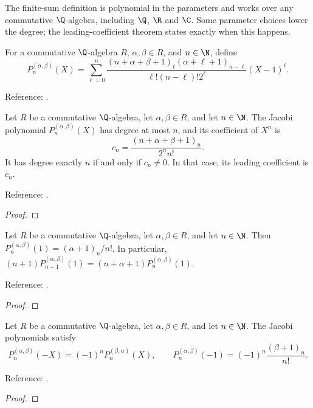 The finite-sum definition is polynomial in the parameters and works over any commutative $\Q$-algebra, including $\Q$, $\R$ and $\C$. Some parameter choices lower the degree; the leading-coefficient theorem states exactly when this happens.

\begin{definition}
\label{def:jacobi}
\leanok
For a commutative $\Q$-algebra $R$, $\alpha,\beta\in R$, and $n\in\N$, define
\[P_n^{(\alpha,\beta)}(X)=\sum_{\ell=0}^n
\frac{(n+\alpha+\beta+1)_\ell(\alpha+\ell+1)_{n-\ell}}
 {\ell!(n-\ell)!2^\ell}(X-1)^\ell.\]

Reference: \cite[18.5.7]{dlmf}.
\end{definition}

\begin{theorem}
\label{thm:jacobi-degree}
\leanok
Let $R$ be a commutative $\Q$-algebra, let $\alpha,\beta\in R$, and let $n\in\N$.
The Jacobi polynomial $P_n^{(\alpha,\beta)}(X)$ has degree at most $n$, and its coefficient of $X^n$ is
\[
 c_n=\frac{(n+\alpha+\beta+1)_n}{2^n n!}.
\]
It has degree exactly $n$ if and only if $c_n\ne0$. In that case, its leading coefficient is $c_n$.

Reference: \cite[Table 18.3.1]{dlmf}.
\end{theorem}
\begin{proof}
\leanok
\end{proof}

\begin{theorem}
\label{thm:jacobi-value-one}
\leanok
Let $R$ be a commutative $\Q$-algebra, let $\alpha,\beta\in R$, and let $n\in\N$. Then
$P_n^{(\alpha,\beta)}(1)=(\alpha+1)_n/n!$. In particular,
$(n+1)P_{n+1}^{(\alpha,\beta)}(1)=(n+\alpha+1)P_n^{(\alpha,\beta)}(1)$.

Reference: \cite[Table 18.6.1]{dlmf}.
\end{theorem}
\begin{proof}
\leanok
\end{proof}

\begin{theorem}
\label{thm:jacobi-values}
\leanok
Let $R$ be a commutative $\Q$-algebra, let $\alpha,\beta\in R$, and let $n\in\N$.
The Jacobi polynomials satisfy
\[P_n^{(\alpha,\beta)}(-X)=(-1)^nP_n^{(\beta,\alpha)}(X),\qquad
P_n^{(\alpha,\beta)}(-1)=(-1)^n\frac{(\beta+1)_n}{n!}.\]

Reference: \cite[Table 18.6.1]{dlmf}.
\end{theorem}
\begin{proof}
\leanok
\end{proof}

